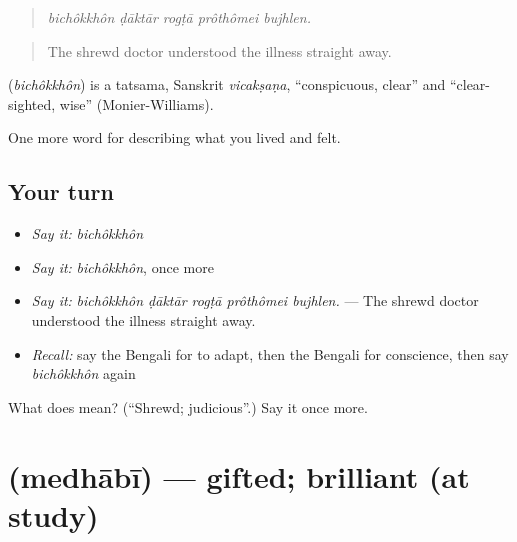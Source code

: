 \begin{quote}
\emph{bichôkkhôn ḍāktār rogṭā prôthômei bujhlen.}
\end{quote}

\begin{quote}
The shrewd doctor understood the illness straight away.
\end{quote}

\begin{cousinweb}
\textbf{} (\emph{bichôkkhôn}) is a tatsama, Sanskrit \emph{vicakṣaṇa}, \textquotedblleft{}conspicuous, clear\textquotedblright{} and \textquotedblleft{}clear-sighted, wise\textquotedblright{} (Monier-Williams).
\end{cousinweb}

\begin{grammarlens}[title={What you've built}]
One more word for describing what you lived and felt.
\end{grammarlens}

\subsection*{Your turn}
\begin{itemize}
\raggedright
  \item \emph{Say it:} \emph{bichôkkhôn}
  \item \emph{Say it:} \emph{bichôkkhôn}, once more
  \item \emph{Say it:} \emph{bichôkkhôn ḍāktār rogṭā prôthômei bujhlen.} — The shrewd doctor understood the illness straight away.
  \item \emph{Recall:} say the Bengali for to adapt, then the Bengali for conscience, then say \emph{bichôkkhôn} again
\end{itemize}

\begin{tcolorbox}[breakable,colback=teal!4,colframe=teal!35!black,title={Before you move on}]
What does  mean? (\textquotedblleft{}Shrewd; judicious\textquotedblright{}.) Say it once more.
\end{tcolorbox}
\section[\texorpdfstring{\bn{মেধাবী} (medhābī)}{মেধাবী (medhābī)}]{ (medhābī) — gifted; brilliant (at study)}

\label{lesson:BN-C465-medhabi}



